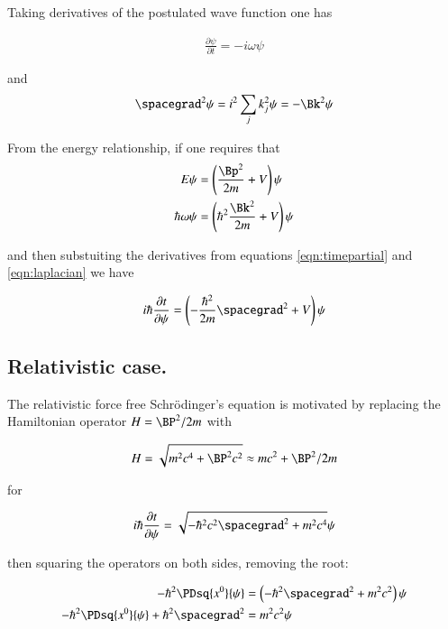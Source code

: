 \documentclass{article}
\begin{document}
Taking derivatives of the postulated wave function one has

\begin{align}\label{eqn:timepartial}
\frac{\partial \psi}{\partial t} = -i \omega \psi
\end{align}

and 
\begin{align}\label{eqn:laplacian}
\spacegrad^2 \psi = i^2 \sum_j k_j^2 \psi = - \Bk^2 \psi
\end{align}

From the energy relationship, if one requires that
\begin{align}
E \psi &= \left(\frac{\Bp^2}{2m} + V\right) \psi \\
\hbar \omega \psi &= \left(\hbar^2 \frac{\Bk^2}{2m} + V\right) \psi \\
\end{align}

and then substuiting the derivatives from equations \ref{eqn:timepartial} and \ref{eqn:laplacian} we have

\begin{align*}
i \hbar \PD{t}{\psi} &= \left(-\frac{\hbar^2}{2m} \spacegrad^2  + V\right) \psi \\
\end{align*}

\subsection{ Relativistic case. }

The relativistic force free Schr\"{o}dinger's equation is motivated by \cite{srednicki2007qft} replacing the Hamiltonian operator $H = \BP^2/{2 m}$ with

\begin{align*}
H = \sqrt{m^2 c^4 + \BP^2 c^2} \approx m c^2 + \BP^2/2m
\end{align*}

for

\begin{align*}
i \hbar \PD{t}{\psi} = \sqrt{ -\hbar^2 c^2 \spacegrad^2 + m^2 c^4} \psi
\end{align*}

then squaring the operators on both sides, removing the root:

\begin{align*}
- \hbar^2 \PDsq{x^0}{\psi} &= \left(-\hbar^2 \spacegrad^2 + m^2 c^2 \right) \psi \\
- \hbar^2 \PDsq{x^0}{\psi} + \hbar^2 \spacegrad^2 &= m^2 c^2 \psi \\
\end{align*}
\end{document}
